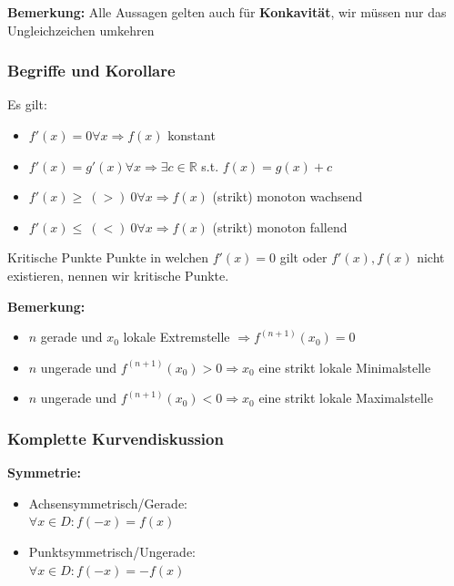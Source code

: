 \documentclass[a4paper,8pt]{extarticle}
\newenvironment{bemerkung}{
   \noindent \textbf{Bemerkung:  }}{}
\def\R{\mathbb{R}}
\begin{document}
\begin{bemerkung}
  Alle Aussagen gelten auch für \textbf{Konkavität}, wir müssen nur das Ungleichzeichen umkehren
\end{bemerkung}

\subsubsection{Begriffe und Korollare}
Es gilt:
\begin{itemize}
  \item $f'(x) = 0 \forall x \Rightarrow f(x)$ konstant
  \item $f'(x) = g'(x) \forall x \Rightarrow \exists c \in \R$ s.t. $f(x) = g(x) + c$
  \item $f'(x) \geq \ (>) \ 0 \forall x \Rightarrow f(x)$ (strikt) monoton wachsend
  \item $f'(x) \leq \ (<) \ 0 \forall x \Rightarrow f(x)$ (strikt) monoton fallend
\end{itemize}

\begin{subbox}{Kritische Punkte}
  Punkte in welchen $f'(x) = 0$ gilt oder $f'(x), f(x)$ nicht existieren, nennen wir kritische Punkte.
\end{subbox}

\begin{bemerkung}
  \begin{itemize}
    \item $n$ gerade und $x_0$ lokale Extremstelle $\Rightarrow f^{(n+1)}(x_0) = 0$
    \item $n$ ungerade und $ f^{(n+1)}(x_0) > 0 \Rightarrow x_0$ eine strikt lokale Minimalstelle
    \item $n$ ungerade und $ f^{(n+1)}(x_0) < 0 \Rightarrow x_0$ eine strikt lokale Maximalstelle
  \end{itemize}
\end{bemerkung}

\subsubsection{Komplette Kurvendiskussion}
\textbf{Symmetrie:}
\begin{itemize}
  \item Achsensymmetrisch/Gerade: \\ $\forall x \in D: f(-x) = f(x)$
  \item Punktsymmetrisch/Ungerade: \\ $\forall x \in D: f(-x) = -f(x)$
\end{itemize}
\end{document}

